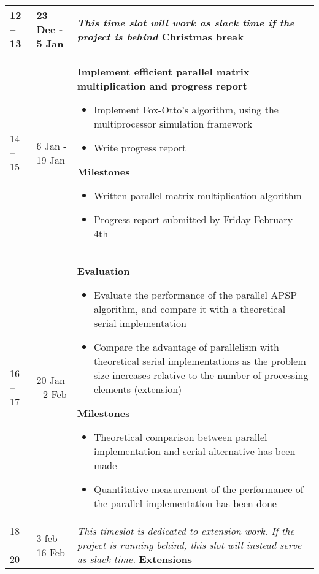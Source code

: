 \documentclass{article}
\begin{document}
\begin{longtable}{m{40pt}m{75pt}m{265pt}}
    \hline
    12 -- 13 & 23 Dec - 5 Jan & %
    \textit{This time slot will work as slack time if the project is behind}
    \textbf{Christmas break} \\
    \hline
    14 -- 15 & 6 Jan - 19 Jan &
    \textbf{Implement efficient parallel matrix multiplication and progress report}
    \begin{itemize}
        \item Implement Fox-Otto's algorithm, using
            the multiprocessor simulation framework
        \item Write progress report
    \end{itemize}
    \textbf{Milestones}
    \begin{itemize}
        \item Written parallel matrix multiplication algorithm
        \item Progress report submitted by Friday February 4th
    \end{itemize} \\
    \hline
    16 -- 17 & 20 Jan - 2 Feb & %
    \textbf{Evaluation}
    \begin{itemize}
        \item Evaluate the performance of the parallel APSP algorithm, and compare it with
            a theoretical serial implementation
        \item Compare the advantage of parallelism with theoretical serial implementations
            as the problem size increases relative to the number of processing
            elements (extension)
    \end{itemize}
    \textbf{Milestones}
    \begin{itemize}
        \item Theoretical comparison between parallel implementation and serial
            alternative has been made
        \item Quantitative measurement of the performance of the parallel
            implementation has been done
    \end{itemize} \\
    \hline
    18 -- 20 & 3 feb - 16 Feb & %
    
    \textit{This timeslot is dedicated to extension work. If the project is
    running behind, this slot will instead serve as slack time.}
    \textbf{Extensions}


\end{longtable}
\end{document}
